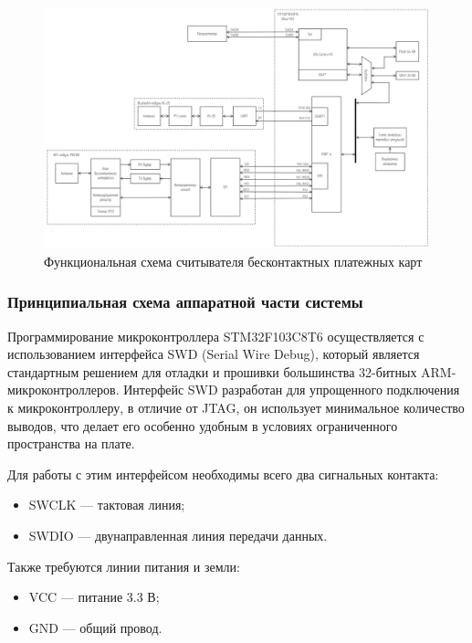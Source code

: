 \begin{figure}[H]
    \centering
    \includegraphics[width=1\textwidth]{images/design/func_scheme}
    \caption{\centering Функциональная схема считывателя бесконтактных платежных карт}
    \label{fig:func_scheme}
\end{figure}





\subsubsection{Принципиальная схема аппаратной части системы}


Программирование микроконтроллера STM32F103C8T6 осуществляется с использованием интерфейса SWD (Serial Wire Debug), который является стандартным решением для отладки и прошивки большинства 32-битных ARM-микроконтроллеров.
Интерфейс SWD разработан для упрощенного подключения к микроконтроллеру, в отличие от JTAG, он использует минимальное количество выводов, что делает его особенно удобным в условиях ограниченного пространства на плате.

Для работы с этим интерфейсом необходимы всего два сигнальных контакта:
\begin{itemize}
    \item SWCLK — тактовая линия;
    \item SWDIO — двунаправленная линия передачи данных.
\end{itemize}

Также требуются линии питания и земли:
\begin{itemize}
    \item VCC — питание 3.3 В;
    \item GND — общий провод.
\end{itemize}

